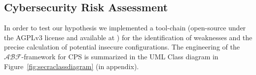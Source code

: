 \documentclass[conference]{IEEEtran}
\newcommand{\assertionRegion}{\mathcal{A}}
\newcommand{\beliefRegion}{\mathcal{B}}
\newcommand{\factRegion}{\mathcal{F}}
\newcommand{\abftheory}{\assertionRegion\beliefRegion\factRegion}
\begin{document}
%

\subsection{Cybersecurity Risk Assessment}\label{sec:secra}
In order to test our hypothesis we implemented a tool-chain (open-source under the
AGPLv3 license and available at \autocite{v-research2020cybersecurity-anonymous}) for the
identification of weaknesses and the precise calculation of potential insecure
configurations. The engineering of the $\abftheory$-framework for CPS is summarized in the UML
Class diagram in Figure~\ref{fig:secraclassdiagram} (in appendix). 
\end{document}
